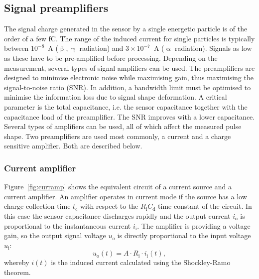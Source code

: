\subsection{Signal preamplifiers}
The signal charge generated in the sensor by a single energetic particle is of the order of a few fC. The range of the induced current for single particles is typically between $10^{-8}$~A ($\upbeta, \upgamma$ radiation) and $3\times10^{-7}$~A ($\upalpha$ radiation). Signals as low as these have to be pre-amplified before processing. Depending on the measurement, several types of signal amplifiers can be used. The preamplifiers are designed to minimise electronic noise while maximising gain, thus maximising the signal-to-noise ratio (SNR). In addition, a bandwidth limit must be optimised to minimise the information loss due to signal shape deformation. A critical parameter is the total capacitance, i.e. the sensor capacitance together with the capacitance load of the preamplifier. The SNR improves with a lower capacitance. Several types of amplifiers can be used, all of which affect the measured pulse shape. Two preamplifiers are used most commonly, a current and a charge sensitive amplifier. Both are described below. 



\subsubsection{Current amplifier}
Figure~\ref{fig:curramp} shows the equivalent circuit of a current source and a current amplifier. An amplifier operates in current mode if the source has a low charge collection time $t_\mathrm{c}$ with respect to the $R_\mathrm{i}C_\mathrm{d}$ time constant of the circuit. In this case the sensor capacitance discharges rapidly and the output current $i_\mathrm{o}$ is proportional to the instantaneous current $i_\mathrm{i}$. The amplifier is providing a voltage gain, so the output signal voltage $u_o$ is directly proportional to the input voltage $u_\mathrm{i}$:
\begin{equation}
u_\mathrm{o}(t) = A \cdot R_\mathrm{i} \cdot i_\mathrm{i}(t),
\end{equation}
whereby $i(t)$ is the induced current calculated using the Shockley-Ramo theorem.


